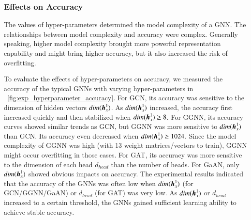 \subsubsection{Effects on Accuracy}
\label{sec:hyper_parameter_accuracy}

%
The values of hyper-parameters determined the model complexity of a GNN.
%
The relationships between model complexity and accuracy were complex.
%
%
Generally speaking, higher model complexity brought more powerful representation capability and might bring higher accuracy, but it also increased the risk of overfitting.

To evaluate the effects of hyper-parameters on accuracy, we measured the accuracy of the typical GNNs with varying hyper-parameters in \figurename~\ref{fig:exp_hyperparameter_accuracy}.
%
For GCN, its accuracy was sensitive to the dimension of hidden vectors $dim(\boldsymbol{h}^1_x)$.
%
As $dim(\boldsymbol{h}^1_x)$ increased, the accuracy first increased quickly and then stabilized when $dim(\boldsymbol{h}_x^1) \geq 8$.
%
For GGNN, its accuracy curves showed similar trends as GCN, but GGNN was more sensitive to $dim(\boldsymbol{h}_x^1)$ than GCN.
%
Its accuracy even decreased when $dim(\boldsymbol{h}_x^1) \geq 1024$.
%
Since the model complexity of GGNN was high (with 13 weight matrices/vectors to train), GGNN might occur overfitting in those cases.
%
For GAT, its accuracy was more sensitive to the dimension of each head $d_{head}$ than the number of heads.
%
For GaAN, only $dim(\boldsymbol{h}_x^1)$ showed obvious impacts on accuracy.
%
The experimental results indicated that the accuracy of the GNNs was often low when $dim(\boldsymbol{h}_x^1)$ (for GCN/GGNN/GaAN) or $d_{head}$ (for GAT) was very low.
%
%
As $dim(\boldsymbol{h}_x^1)$ or $d_{head}$ increased to a certain threshold, the GNNs gained sufficient learning ability to achieve stable accuracy.

